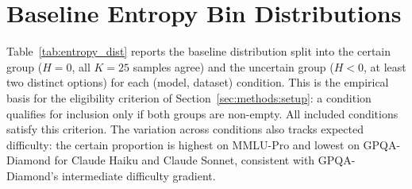 \section{Baseline Entropy Bin Distributions}
\label{app:entropy_dist}

Table~\ref{tab:entropy_dist} reports the baseline distribution split
into the certain group ($H = 0$, all $K = 25$ samples agree) and the
uncertain group ($H < 0$, at least two distinct options) for each
(model, dataset) condition. This is the empirical basis for the eligibility criterion of Section~\ref{sec:methods:setup}: a condition qualifies for inclusion only if both groups are non-empty. All included conditions satisfy this criterion. The variation across conditions also tracks expected difficulty: the certain proportion is highest on MMLU-Pro and lowest on GPQA-Diamond for Claude Haiku and Claude Sonnet, consistent with GPQA-Diamond's intermediate difficulty gradient.

